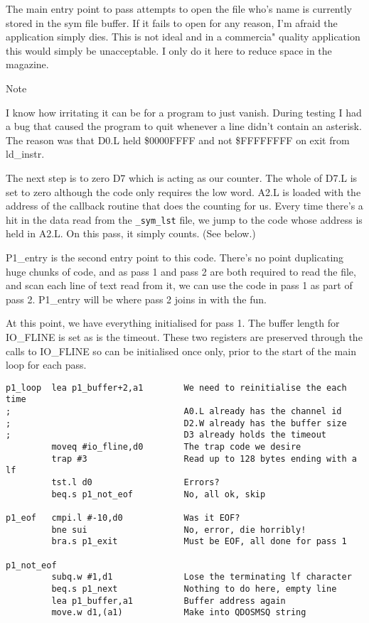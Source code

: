 The main entry point to pass attempts to open the file who's name is
    currently stored in the sym file buffer. If it fails to open for any
    reason, I'm afraid the application simply dies. This is not ideal and in a
    commercia" quality application this would simply be unacceptable. I only
    do it here to reduce space in the magazine.
\begin{DBKadmonition}{}{Note}

I know how irritating it can be for a program to just vanish.
      During testing I had a bug that caused the program to quit whenever a
      line didn't contain an asterisk. The reason was that D0.L held \$0000FFFF
      and not \$FFFFFFFF on exit from ld\_instr.
\end{DBKadmonition}

The next step is to zero D7 which is acting as our counter. The
    whole of D7.L is set to zero although the code only requires the low word.
    A2.L is loaded with the address of the callback routine that does the
    counting for us. Every time there's a hit in the data read from the
 \nolinkurl{_sym_lst} file, we jump to the code whose address is
    held in A2.L. On this pass, it simply counts. (See below.)

P1\_entry is the second entry point to this
    code. There's no point duplicating huge chunks of code, and as pass 1 and
    pass 2 are both required to read the file, and scan each line of text read
    from it, we can use the code in pass 1 as part of pass 2.
 P1\_entry will be where pass 2 joins in with the
    fun.

At this point, we have everything initialised for pass 1. The buffer
    length for IO\_FLINE is set as is the timeout. These two registers are
    preserved through the calls to IO\_FLINE so can be initialised once only,
    prior to the start of the main loop for each pass.

\begin{lstlisting}[firstnumber=1,]
p1_loop  lea p1_buffer+2,a1        We need to reinitialise the each time
;                                  A0.L already has the channel id
;                                  D2.W already has the buffer size
;                                  D3 already holds the timeout
         moveq #io_fline,d0        The trap code we desire
         trap #3                   Read up to 128 bytes ending with a lf
         tst.l d0                  Errors?
         beq.s p1_not_eof          No, all ok, skip

p1_eof   cmpi.l #-10,d0            Was it EOF?
         bne sui                   No, error, die horribly!
         bra.s p1_exit             Must be EOF, all done for pass 1

p1_not_eof
         subq.w #1,d1              Lose the terminating lf character
         beq.s p1_next             Nothing to do here, empty line
         lea p1_buffer,a1          Buffer address again
         move.w d1,(a1)            Make into QDOSMSQ string
\end{lstlisting}

